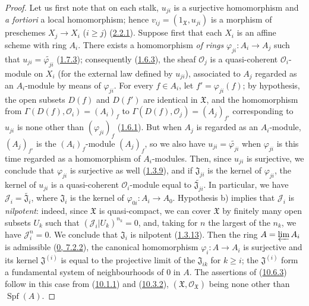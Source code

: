 \begin{proof}
Let us first note that on each stalk, $u_{ji}$ is a surjective
homomorphism and \emph{a fortiori} a local homomorphism; hence
$v_{ij}=(1_{\mathfrak{X}},u_{ji})$ is a morphism of preschemes
$X_j\to X_i$ ($i\geq j$) (\hyperref[I.2.2.1]{2.2.1}). Suppose
first that each $X_i$ is an affine scheme with ring $A_i$. There exists
a homomorphism \emph{of rings}
$\varphi_{ji}:A_i\to A_j$ such that
$u_{ji}=\widetilde{\varphi_{ji}}$
(\hyperref[I.1.7.3]{1.7.3}); consequently
(\hyperref[I.1.6.3]{1.6.3}), the sheaf $\mathscr{O}_j$ is a
quasi-coherent $\mathscr{O}_i$-module on $X_i$ (for the external law
defined by $u_{ji}$), associated to $A_j$ regarded as an $A_i$-module by
means of $\varphi_{ji}$. For every $f\in A_i$, let
$f'=\varphi_{ji}(f)$; by hypothesis, the open subsets $D(f)$ and $D(f')$
are identical in $\mathfrak{X}$, and the homomorphism from
$\Gamma(D(f),\mathscr{O}_i)=(A_i)_f$ to
$\Gamma(D(f),\mathscr{O}_j)=(A_j)_{f'}$ corresponding to $u_{ji}$ is
none other than $(\varphi_{ji})_f$ (\hyperref[I.1.6.1]{1.6.1}). But
when $A_j$ is regarded as an $A_i$-module, $(A_j)_{f'}$ is the
$(A_i)_f$-module $(A_j)_f$, so we also have
$u_{ji}=\widetilde{\varphi_{ji}}$ when $\varphi_{ji}$ is this time
regarded as a homomorphism of $A_i$-modules. Then, since $u_{ji}$ is
surjective, we conclude that $\varphi_{ji}$ is surjective as well
(\hyperref[I.1.3.9]{1.3.9}), and if $\mathfrak{J}_{ji}$ is the kernel of
$\varphi_{ji}$, the kernel of $u_{ji}$ is a quasi-coherent
$\mathscr{O}_i$-module equal to $\widetilde{\mathfrak{J}_{ji}}$. In
particular, we have $\mathscr{J}_i=\widetilde{\mathfrak{J}_i}$, where
$\mathfrak{J}_i$ is the kernel of $\varphi_{0i}:A_i\to A_0$. Hypothesis
b) implies that $\mathscr{J}_i$ is \emph{nilpotent}: indeed, since
$\mathfrak{X}$ is quasi-compact, we can cover $\mathfrak{X}$ by finitely
many open subsets $U_k$ such that $(\mathscr{J}_i|U_k)^{n_k}=0$, and,
taking for $n$ the largest of the $n_k$, we have $\mathscr{J}_i^n=0$. We
conclude that $\mathfrak{J}_i$ is nilpotent
(\hyperref[I.1.3.13]{1.3.13}). Then the ring $A=\varprojlim A_i$ is
admissible (\hyperref[0.7.2.2]{0, 7.2.2}), the canonical homomorphism
$\varphi_i:A\to A_i$ is surjective and its kernel
$\mathfrak{J}^{(i)}$ is equal to the projective limit of the
$\mathfrak{J}_{ik}$ for $k\geq i$; the $\mathfrak{J}^{(i)}$ form
a fundamental system of neighbourhoods of 0 in $A$. The assertions of
(\hyperref[I.10.6.3]{10.6.3}) follow in this case from
(\hyperref[I.10.1.1]{10.1.1}) and
(\hyperref[I.10.3.2]{10.3.2}),
$(\mathfrak{X},\mathscr{O}_{\mathfrak{X}})$ being none other than
$\operatorname{Spf}(A)$.


\end{proof}
